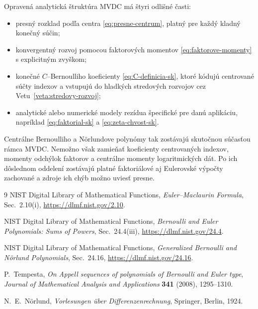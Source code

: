 \documentclass[11pt,a4paper]{article}
\begin{document}
Opravená analytická štruktúra MVDC má štyri odlišné časti:
\par\smallskip
\begin{itemize}
  \item presný rozklad podľa centra \eqref{eq:presne-centrum}, platný pre
        každý kladný konečný súčin;
  \item konvergentný rozvoj pomocou faktorových momentov
        \eqref{eq:faktorove-momenty} s explicitným zvyškom;
  \item konečné \(C\)--Bernoulliho koeficienty
        \eqref{eq:C-definicia-sk}, ktoré kódujú centrované súčty indexov
        a vstupujú do hladkých stredových rozvojov cez
        Vetu~\ref{veta:stredovy-rozvoj};
  \item analytické alebo numerické modely rezídua špecifické pre danú
        aplikáciu, napríklad \eqref{eq:faktorial-sk} a
        \eqref{eq:zeta-chvost-sk}.
\end{itemize}
Centrálne Bernoulliho a Nörlundove polynómy tak zostávajú skutočnou
súčasťou rámca MVDC. Nemožno však zamieňať koeficienty centrovaných
indexov, momenty odchýlok faktorov a centrálne momenty logaritmických
dát. Po ich dôslednom oddelení zostávajú platné faktoriálové aj
Eulerovské výpočty zachované a zdroje ich chýb možno uviesť presne.

\begin{thebibliography}{9}
NIST Digital Library of Mathematical Functions,
\emph{Euler--Maclaurin Formula}, Sec.~2.10(i),
\url{https://dlmf.nist.gov/2.10}.

NIST Digital Library of Mathematical Functions,
\emph{Bernoulli and Euler Polynomials: Sums of Powers}, Sec.~24.4(iii),
\url{https://dlmf.nist.gov/24.4}.

NIST Digital Library of Mathematical Functions,
\emph{Generalized Bernoulli and Nörlund Polynomials}, Sec.~24.16,
\url{https://dlmf.nist.gov/24.16}.

P.~Tempesta,
\emph{On Appell sequences of polynomials of Bernoulli and Euler type},
\emph{Journal of Mathematical Analysis and Applications}
\textbf{341} (2008), 1295--1310.

N.~E.~Nörlund,
\emph{Vorlesungen über Differenzenrechnung},
Springer, Berlin, 1924.
\end{thebibliography}
\end{document}
